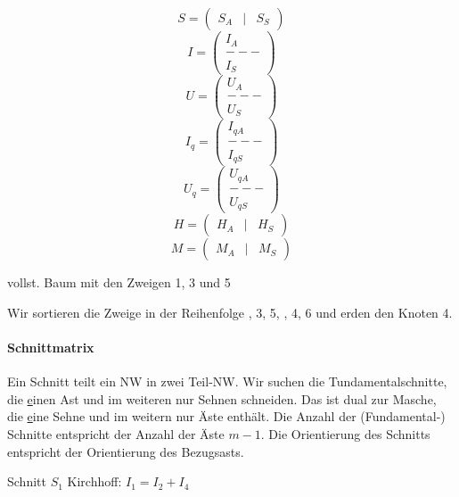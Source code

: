 \documentclass[german]{article}
\begin{document}
\[
	S = \begin{pmatrix}S_A & | & S_S\end{pmatrix}
\]
\[
	I = \begin{pmatrix}
		I_A \\
		--- \\
		I_S
	\end{pmatrix}
\]
\[
	U = \begin{pmatrix}
		U_A \\
		--- \\
		U_S
	\end{pmatrix}
\]
\[
	I_q = \begin{pmatrix}
		I_{qA} \\
		--- \\
		I_{qS}
	\end{pmatrix}
\]
\[
	U_q = \begin{pmatrix}
		U_{qA} \\
		--- \\
		U_{qS}
	\end{pmatrix}
\]
\[
	H = \begin{pmatrix}
		H_A & | & H_S
	\end{pmatrix}
\]
\[
	M = \begin{pmatrix}
		M_A & | & M_S
	\end{pmatrix}
\]


vollst. Baum mit den Zweigen 1, 3 und 5


Wir sortieren die Zweige in der Reihenfolge
{, 3, 5, }{, 4, 6}
und erden den Knoten 4.

\paragraph{Schnittmatrix}
Ein Schnitt teilt ein NW in zwei Teil-NW. Wir suchen die Tundamentalschnitte, die {\underline einen} Ast und im weiteren nur Sehnen schneiden. Das ist dual zur Masche, die {\underline eine} Sehne und im weitern nur Äste enthält. Die Anzahl der (Fundamental-) Schnitte entspricht der Anzahl der Äste $m-1$. Die Orientierung des Schnitts entspricht der Orientierung des Bezugsasts.


Schnitt $S_1$
Kirchhoff: $I_1 = I_2 + I_4$
\end{document}
